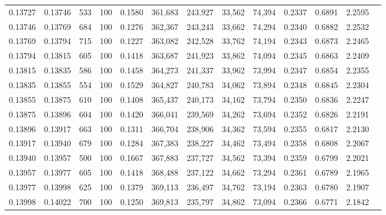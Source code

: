 \begin{tabular}{rrrrrrrrrrrrr}
0.13727 & 0.13746 &   533 & 100 &                                     0.1580 & 361,683 & 243,927 &  33,562 &  74,394 & 0.2337 & 0.6891 & 2.2595 \\
0.13746 & 0.13769 &   684 & 100 &                                     0.1276 & 362,367 & 243,243 &  33,662 &  74,294 & 0.2340 & 0.6882 & 2.2532 \\
0.13769 & 0.13794 &   715 & 100 &                                     0.1227 & 363,082 & 242,528 &  33,762 &  74,194 & 0.2343 & 0.6873 & 2.2465 \\
0.13794 & 0.13815 &   605 & 100 &                                     0.1418 & 363,687 & 241,923 &  33,862 &  74,094 & 0.2345 & 0.6863 & 2.2409 \\
0.13815 & 0.13835 &   586 & 100 &                                     0.1458 & 364,273 & 241,337 &  33,962 &  73,994 & 0.2347 & 0.6854 & 2.2355 \\
0.13835 & 0.13855 &   554 & 100 &                                     0.1529 & 364,827 & 240,783 &  34,062 &  73,894 & 0.2348 & 0.6845 & 2.2304 \\
0.13855 & 0.13875 &   610 & 100 &                                     0.1408 & 365,437 & 240,173 &  34,162 &  73,794 & 0.2350 & 0.6836 & 2.2247 \\
0.13875 & 0.13896 &   604 & 100 &                                     0.1420 & 366,041 & 239,569 &  34,262 &  73,694 & 0.2352 & 0.6826 & 2.2191 \\
0.13896 & 0.13917 &   663 & 100 &                                     0.1311 & 366,704 & 238,906 &  34,362 &  73,594 & 0.2355 & 0.6817 & 2.2130 \\
0.13917 & 0.13940 &   679 & 100 &                                     0.1284 & 367,383 & 238,227 &  34,462 &  73,494 & 0.2358 & 0.6808 & 2.2067 \\
0.13940 & 0.13957 &   500 & 100 &                                     0.1667 & 367,883 & 237,727 &  34,562 &  73,394 & 0.2359 & 0.6799 & 2.2021 \\
0.13957 & 0.13977 &   605 & 100 &                                     0.1418 & 368,488 & 237,122 &  34,662 &  73,294 & 0.2361 & 0.6789 & 2.1965 \\
0.13977 & 0.13998 &   625 & 100 &                                     0.1379 & 369,113 & 236,497 &  34,762 &  73,194 & 0.2363 & 0.6780 & 2.1907 \\
0.13998 & 0.14022 &   700 & 100 &                                     0.1250 & 369,813 & 235,797 &  34,862 &  73,094 & 0.2366 & 0.6771 & 2.1842 \\

\end{tabular}
